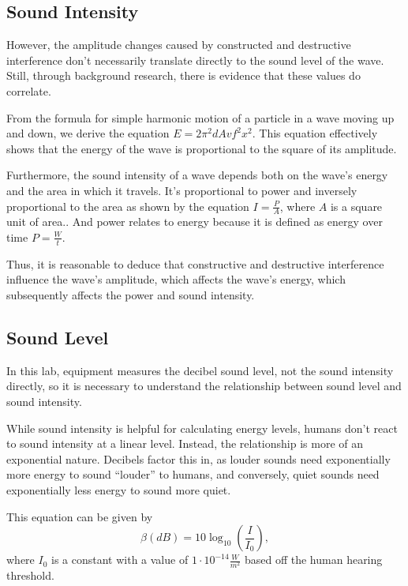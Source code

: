 \documentclass[index]{subfiles}
\begin{document}
\subsection{Sound Intensity}

However, the amplitude changes caused by constructed and destructive interference don't necessarily translate directly to the sound level of the wave. Still, through background research, there is evidence that these values do correlate.

From the formula for simple harmonic motion of a particle in a wave moving up and down, we derive the equation \(E=2\pi^2dAvf^2x^2\)\cite{giancoli1995physics}. This equation effectively shows that the energy of the wave is proportional to the square of its amplitude\cite{openstax}.

Furthermore, the sound intensity of a wave depends both on the wave's energy and the area in which it travels. It's proportional to power and inversely proportional to the area as shown by the equation \(I=\frac{P}{A}\), where \(A\) is a square unit of area.\cite{openstax}. And power relates to energy because it is defined as energy over time \(P=\frac{W}{t}\).

Thus, it is reasonable to deduce that constructive and destructive interference influence the wave's amplitude, which affects the wave's energy, which subsequently affects the power and sound intensity.

\subsection{Sound Level}

In this lab, equipment measures the decibel sound level, not the sound intensity directly, so it is necessary to understand the relationship between sound level and sound intensity.

While sound intensity is helpful for calculating energy levels, humans don't react to sound intensity at a linear level. Instead, the relationship is more of an exponential nature. Decibels factor this in, as louder sounds need exponentially more energy to sound ``louder'' to humans, and conversely, quiet sounds need exponentially less energy to sound more quiet\cite{openstax}.

This equation can be given by
\[
    \beta\left(dB\right)=10\log_{10}\left(\frac{I}{I_{0}}\right)
    ,\] where \(I_{0}\) is a constant with a value of \(1\cdot10^{-14}\frac{W}{m^2}\) based off the human hearing threshold\cite{openstax}.
\end{document}
